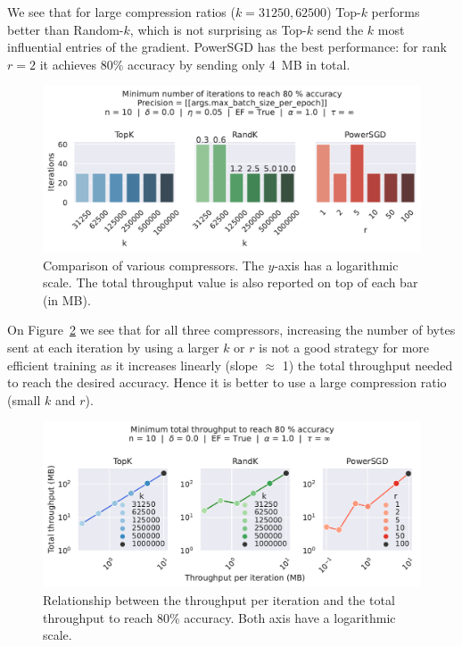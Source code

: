 \documentclass{article}
\begin{document}
We see that for large compression ratios ($k=31250, 62500$) Top-$k$ performs better than Random-$k$, which is not surprising as Top-$k$ send the $k$ most influential entries of the gradient. PowerSGD has the best performance: for rank $r=2$ it achieves 80\% accuracy by sending only 4~MB in total.

\begin{figure}[h]
\centering
\includegraphics[scale=0.65]{figures/EXP_Compressors_Bars}
\caption{Comparison of various compressors. The $y$-axis has a logarithmic scale. The total throughput value is also reported on top of each bar (in MB).}\label{fig:compressors-bar}
\end{figure}


On Figure~\ref{fig:compressors-bar-bytes-per-iter} we see that for all three compressors, increasing the number of bytes sent at each iteration by using a larger $k$ or $r$ is not a good strategy for more efficient training as it increases linearly (slope $\approx$ 1) the total throughput needed to reach the desired accuracy. Hence it is better to use a large compression ratio (small $k$ and $r$).

\begin{figure}[h]
\centering
\includegraphics[scale=0.65]{figures/EXP_Compressors_Bars_By_Iter}
\caption{Relationship between the throughput per iteration and the total throughput to reach 80\% accuracy. Both axis have a logarithmic scale.}\label{fig:compressors-bar-bytes-per-iter}
\end{figure}
\end{document}

